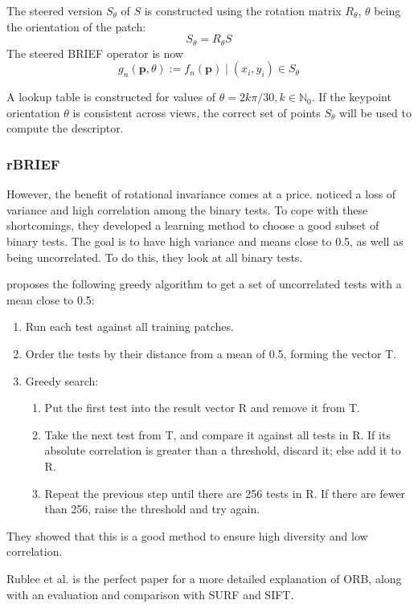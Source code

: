 The steered version $S_\theta$ of $S$ is constructed using the rotation matrix $R_\theta$, $\theta$ being the orientation of the patch:
\begin{equation}
    S_\theta = R_\theta S
\end{equation}
The steered BRIEF operator is now
\begin{equation}
    g_n(\boldsymbol{p},\theta):=f_n(\boldsymbol{p})\mid(x_i,y_i)\in S_\theta
\end{equation}

A lookup table is constructed for values of $\theta = 2k\pi/30, k \in \mathbb{N}_0$. If the keypoint orientation $\theta$ is consistent across views, the correct set of points $S_\theta$ will be used to compute the descriptor.

\subsubsection{rBRIEF}
However, the benefit of rotational invariance comes at a price. \cite{6126544} noticed a loss of variance and high correlation among the binary tests. To cope with these shortcomings, they developed a learning method to choose a good subset of binary tests. The goal is to have high variance and means close to 0.5, as well as being uncorrelated. To do this, they look at all binary tests.\bigskip

\cite{6126544} proposes the following greedy algorithm to get a set of uncorrelated tests with a mean close to 0.5:
\begin{enumerate}
    \item Run each test  against all training patches.\smallskip
    \item Order the tests by their distance from a mean of 0.5, forming the vector T.\smallskip
    \item Greedy search:\smallskip
    \begin{enumerate}
        \item Put the first test into the result vector R and remove it from T.\smallskip
        \item Take the next test from T, and compare it against all tests in R. If its absolute correlation is greater than a threshold, discard it; else add it to R.\smallskip
        \item Repeat the previous step until there are 256 tests in R. If there are fewer than 256, raise the threshold and try again.\smallskip
    \end{enumerate}
\end{enumerate}

They showed that this is a good method to ensure high diversity and low correlation.\bigskip

Rublee et al.\cite{6126544} is the perfect paper for a more detailed explanation of ORB, along with an evaluation and comparison with SURF and SIFT.